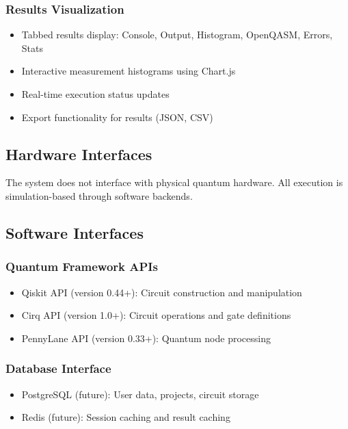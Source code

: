 \subsubsection{Results Visualization}
\begin{itemize}
    \item Tabbed results display: Console, Output, Histogram, OpenQASM, Errors, Stats
    \item Interactive measurement histograms using Chart.js
    \item Real-time execution status updates
    \item Export functionality for results (JSON, CSV)
\end{itemize}

\subsection{Hardware Interfaces}

The system does not interface with physical quantum hardware. All execution is simulation-based through software backends.

\subsection{Software Interfaces}

\subsubsection{Quantum Framework APIs}
\begin{itemize}
    \item Qiskit API (version 0.44+): Circuit construction and manipulation \cite{qiskit}
    \item Cirq API (version 1.0+): Circuit operations and gate definitions \cite{cirq_developers_2023}
    \item PennyLane API (version 0.33+): Quantum node processing \cite{bergholm2018pennylane}
\end{itemize}

\subsubsection{Database Interface}
\begin{itemize}
    \item PostgreSQL (future): User data, projects, circuit storage
    \item Redis (future): Session caching and result caching
\end{itemize}

